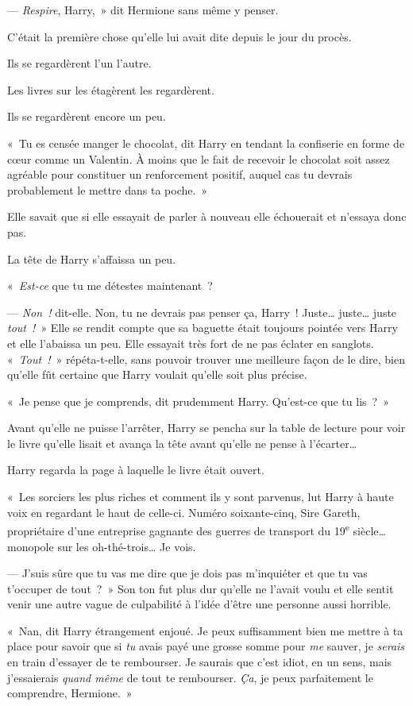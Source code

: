 --- \emph{Respire}, Harry,~» dit Hermione sans même y penser.

C'était la première chose qu'elle lui avait dite depuis le jour du procès.

Ils se regardèrent l'un l'autre.

Les livres sur les étagèrent les regardèrent.

Ils se regardèrent encore un peu.

«~Tu es censée manger le chocolat, dit Harry en tendant la confiserie en forme de cœur comme un Valentin.
À moins que le fait de recevoir le chocolat soit assez agréable pour constituer un renforcement positif, auquel cas tu devrais probablement le mettre dans ta poche.~»

Elle savait que si elle essayait de parler à nouveau elle échouerait et n'essaya donc pas.

La tête de Harry s'affaissa un peu.

«~\emph{Est-ce} que tu me détestes maintenant~?

--- \emph{Non~!} dit-elle.
Non, tu ne devrais pas penser ça, Harry~!
Juste… juste… juste \emph{tout~!}~» Elle se rendit compte que sa baguette était toujours pointée vers Harry et elle l'abaissa un peu.
Elle essayait très fort de ne pas éclater en sanglots.
«~\emph{Tout~!}~» répéta-t-elle, sans pouvoir trouver une meilleure façon de le dire, bien qu'elle fût certaine que Harry voulait qu'elle soit plus précise.

«~Je pense que je comprends, dit prudemment Harry.
Qu'est-ce que tu lis~?~»

Avant qu'elle ne puisse l'arrêter, Harry se pencha sur la table de lecture pour voir le livre qu'elle lisait et avança la tête avant qu'elle ne pense à l'écarter…

Harry regarda la page à laquelle le livre était ouvert.

«~Les sorciers les plus riches et comment ils y sont parvenus, lut Harry à haute voix en regardant le haut de celle-ci.
Numéro soixante-cinq, Sire Gareth, propriétaire d'une entreprise gagnante des guerres de transport du 19\textsuperscript{e} siècle… monopole sur les oh-thé-trois…
Je vois.

--- J'suis sûre que tu vas me dire que je dois pas m'inquiéter et que tu vas t'occuper de tout~?~»
Son ton fut plus dur qu'elle ne l'avait voulu et elle sentit venir une autre vague de culpabilité à l'idée d'être une personne aussi horrible.

«~Nan, dit Harry étrangement enjoué.
Je peux suffisamment bien me mettre à ta place pour savoir que si \emph{tu} avais payé une grosse somme pour \emph{me} sauver, je \emph{serais} en train d'essayer de te rembourser.
Je saurais que c'est idiot, en un sens, mais j'essaierais \emph{quand même} de tout te rembourser.
\emph{Ça}, je peux parfaitement le comprendre, Hermione.~»

